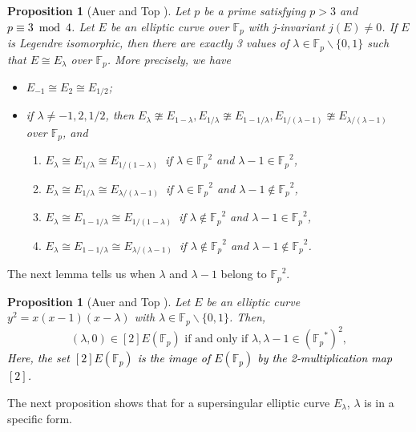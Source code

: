 \documentclass[10pt,a4paper]{amsart}
\theoremstyle{plain}
\newtheorem{prop}[defn]{Proposition}
\newcommand{\lm}{\lambda}
\newcommand{\fp}{\mathbb{F}_p}
\begin{document}
\begin{prop}[Auer and Top {\cite[Lemma 3.1.]{AT02}}]
\label{legendrecase}
    Let $p$ be a prime satisfying $p>3$ and \textcolor{black}{$p \equiv 3 \bmod 4$}. Let $E$ be an elliptic curve over $\fp$ with j-invariant $j(E) \ne 0$. If $E$ is Legendre isomorphic, then there are exactly 3 values of $\lm \in \fp \smallsetminus \{0,1\}$ such that $E \cong E_{\lm}$ over $\fp$. More precisely, we have
    \begin{itemize}
        \item  $E_{-1} \cong E_{2} \cong E_{1/2}$;
        \item  if $\lm \neq -1,2,1/2$, then $E_{\lm} \ncong E_{1-\lm},E_{1/\lm} \ncong E_{1-1/\lm},E_{1/(\lm-1)} \ncong E_{\lm/(\lm-1)}$ over $\fp$, and 
        \begin{enumerate}
        
            \item [] $E_{\lm} \cong E_{1/\lm} \cong E_{1/(1-\lm)} \ $ if $\lm \in {\fp}^2$ and $ \lm-1 \in {\fp}^2$,

            \item[]  $E_{\lm} \cong E_{1/\lm} \cong E_{\lm/(\lm-1)} \ $
            if $\lm \in {\fp}^2$ and $\lm-1 \notin {\fp}^2$,

            \item [] $E_{\lm} \cong E_{1-1/\lm} \cong E_{1/(1-\lm)} \ $ if $\lm \notin {\fp}^2$ and $ \lm-1 \in {\fp}^2$,

            \item[]  $E_{\lm} \cong E_{1-1/\lm} \cong E_{\lm/(\lm-1)} \ $
            if $\lm \notin {\fp}^2$ and $ \lm-1 \notin {\fp}^2$.
            
        \end{enumerate}
    \end{itemize}
\end{prop}

The next lemma tells us when $\lm$ and $\lm-1$ belong to ${\fp}^2$.


\begin{prop}[Auer and Top {\cite[Lemma 2.1.]{AT02}}]
\label{abginf2?}
    Let $E$ be an elliptic curve $y^2=x(x-1)(x-\lm)$ with $\lm \in \fp \smallsetminus\{0,1\}$. Then,
    \[
    (\lm,0)\in [2]E(\fp) \text{ if and only if } \lm,\lm-1 \in \left( {\fp}^{*} \right) ^2,
    \]
   \textcolor{black}{ Here, the set $[2]E(\fp)$ is the image of $E(\fp)$ by the 2-multiplication map $[2]$.}
\end{prop}

The next proposition shows that for a supersingular elliptic curve $E_{\lm}$, $\lm$ is in a specific form.
\end{document}
